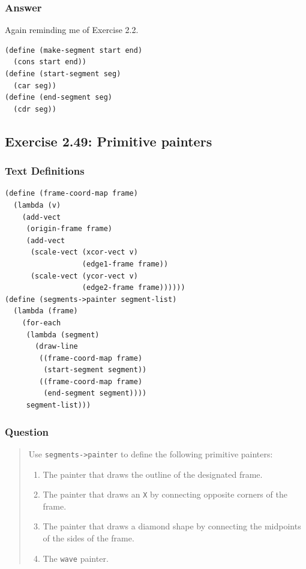 \documentclass[final,fleqn,titlepage,twoside]{article}
\begin{document}
\subsubsection{Answer}
\label{sec:org0b9ef1f}
Again reminding me of Exercise 2.2.

\begin{verbatim}
(define (make-segment start end)
  (cons start end))
(define (start-segment seg)
  (car seg))
(define (end-segment seg)
  (cdr seg))
\end{verbatim}

\subsection{Exercise 2.49: Primitive painters}
\label{sec:org453431f}
\subsubsection{Text Definitions}
\label{sec:org992b9a1}
\begin{verbatim}
(define (frame-coord-map frame)
  (lambda (v)
    (add-vect
     (origin-frame frame)
     (add-vect 
      (scale-vect (xcor-vect v)
                  (edge1-frame frame))
      (scale-vect (ycor-vect v)
                  (edge2-frame frame))))))
(define (segments->painter segment-list)
  (lambda (frame)
    (for-each
     (lambda (segment)
       (draw-line
        ((frame-coord-map frame)
         (start-segment segment))
        ((frame-coord-map frame)
         (end-segment segment))))
     segment-list)))
\end{verbatim}

\subsubsection{Question}
\label{sec:org50b1946}
\begin{quote}
Use \texttt{segments->painter}
to define the following primitive painters:

\begin{enumerate}
\item The painter that draws the outline of the designated frame.
\item The painter that draws an \texttt{X} by connecting opposite corners of the frame.
\item The painter that draws a diamond shape by connecting the midpoints of the
sides of the frame.
\item The \texttt{wave} painter.
\end{enumerate}
\end{quote}
\end{document}
